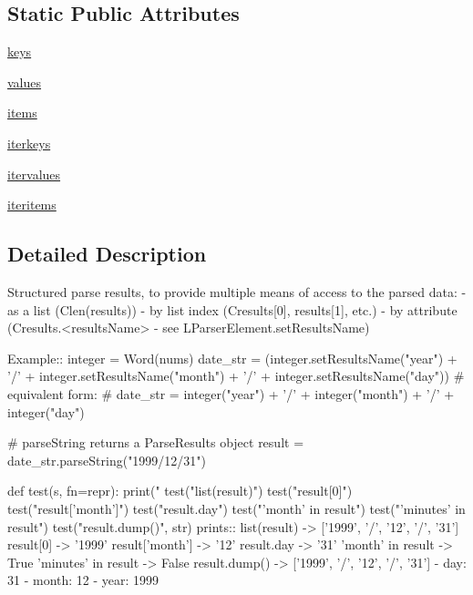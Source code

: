 \subsection*{Static Public Attributes}
\begin{DoxyCompactItemize}
\item 
\hyperlink{classpkg__resources_1_1__vendor_1_1pyparsing_1_1ParseResults_acca72edfb157e59c54b38e63960beede}{keys}
\item 
\hyperlink{classpkg__resources_1_1__vendor_1_1pyparsing_1_1ParseResults_a94e2d1562ec4647d11b89717a5d0cba7}{values}
\item 
\hyperlink{classpkg__resources_1_1__vendor_1_1pyparsing_1_1ParseResults_ae7f3ff5dd36980859282eb575c537f7d}{items}
\item 
\hyperlink{classpkg__resources_1_1__vendor_1_1pyparsing_1_1ParseResults_acc9702715b0f795e70efbabbdaf92873}{iterkeys}
\item 
\hyperlink{classpkg__resources_1_1__vendor_1_1pyparsing_1_1ParseResults_acdacb0eae50738d9af63f9d27c2c8715}{itervalues}
\item 
\hyperlink{classpkg__resources_1_1__vendor_1_1pyparsing_1_1ParseResults_a7cabf2603f6c6f770e3b6a980993a507}{iteritems}
\end{DoxyCompactItemize}


\subsection{Detailed Description}
\begin{DoxyVerb}Structured parse results, to provide multiple means of access to the parsed data:
   - as a list (C{len(results)})
   - by list index (C{results[0], results[1]}, etc.)
   - by attribute (C{results.<resultsName>} - see L{ParserElement.setResultsName})

Example::
    integer = Word(nums)
    date_str = (integer.setResultsName("year") + '/' 
                    + integer.setResultsName("month") + '/' 
                    + integer.setResultsName("day"))
    # equivalent form:
    # date_str = integer("year") + '/' + integer("month") + '/' + integer("day")

    # parseString returns a ParseResults object
    result = date_str.parseString("1999/12/31")

    def test(s, fn=repr):
        print("%
    test("list(result)")
    test("result[0]")
    test("result['month']")
    test("result.day")
    test("'month' in result")
    test("'minutes' in result")
    test("result.dump()", str)
prints::
    list(result) -> ['1999', '/', '12', '/', '31']
    result[0] -> '1999'
    result['month'] -> '12'
    result.day -> '31'
    'month' in result -> True
    'minutes' in result -> False
    result.dump() -> ['1999', '/', '12', '/', '31']
    - day: 31
    - month: 12
    - year: 1999
\end{DoxyVerb}
 

